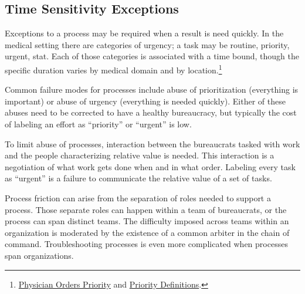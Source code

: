 \subsection*{Time Sensitivity Exceptions}
Exceptions to a process may be required when a result is need quickly. In the medical setting there are categories of urgency; a task may be routine, priority, urgent, stat. 
Each of those categories is associated with a time bound, though the specific duration varies by medical domain and by location.\footnote{\href{http://docport.columbia-stmarys.org/EHR/PhysicianOrdersPriorityandDeptServiceHours.aspx}{Physician Orders Priority}\iftoggle{boundbook}{ on http://docport.columbia-stmarys.org}{} and \href{https://www.unitypoint.org/peoria/services-priority-definitions-and-critical-values.aspx}{Priority Definitions}\iftoggle{boundbook}{ from https://www.unitypoint.org}{}.}

Common failure modes for processes include abuse of prioritization (everything is important) or abuse of urgency (everything is needed quickly). Either of these abuses need to be corrected to have a healthy bureaucracy, but typically the cost of labeling an effort as ``priority'' or ``urgent'' is low. 

To limit abuse of processes, interaction between the bureaucrats tasked with work and the people characterizing relative value is needed. This interaction is a negotiation of what work gets done when and in what order. Labeling every task as ``urgent'' is a failure to communicate the relative value of a set of tasks.


Process friction can arise from the separation of roles needed to support a process. Those separate roles can happen within a team of bureaucrats, or the process can span distinct teams. The difficulty imposed across teams within an organization is moderated by the existence of a common arbiter in the chain of command.  
Troubleshooting processes is even more complicated when processes span organizations.  